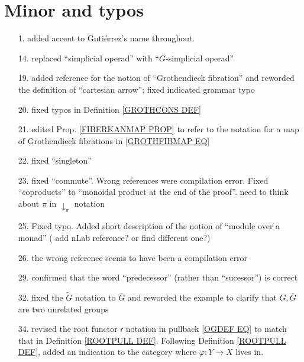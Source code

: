 \documentclass{article}
\begin{document}
\section{Minor and typos} 


\begin{itemize}
\item[1.] added accent to Guti\'{e}rrez's name throughout.

\item[14.] replaced ``simplicial operad'' with  ``$G$-simplicial operad''

\item[19.] added reference for the notion of ``Grothendieck fibration'' and reworded the definition of ``cartesian arrow''; fixed indicated grammar typo

\item[20.] fixed typos in Definition \ref{GROTHCONS DEF}

\item[21.] edited Prop. \ref{FIBERKANMAP PROP} to refer to the notation for a map of Grothendieck fibrations in \eqref{GROTHFIBMAP EQ}

\item[22.] fixed ``singleton''

\item[23.] fixed ``commute''. Wrong references were compilation error.
Fixed ``coproducts'' to ``monoidal product at the end of the proof''. {\color{red} need to think about $\pi$ in $\downarrow_{\pi}$ notation}

\item[25.] Fixed typo. Added short description of the notion of ``module over a monad'' ({\color{red} add nLab reference? or find different one?})

\item[26.] the wrong reference seems to have been a compilation error

\item[29.] confirmed that the word ``predecessor'' (rather than ``sucessor'') is correct

\item[32.] fixed the $\tilde{G}$ notation to $\bar{G}$ and reworded the example to clarify that $G,\bar{G}$ are two unrelated groups

\item[34.] revised the root functor $\mathsf{r}$ notation in pullback \eqref{OGDEF EQ} 
to match that in Definition \ref{ROOTPULL DEF}.
Following Definition \ref{ROOTPULL DEF},
added an indication to the category where 
$\varphi \colon Y \to X$ lives in.


\end{itemize}
\end{document}
